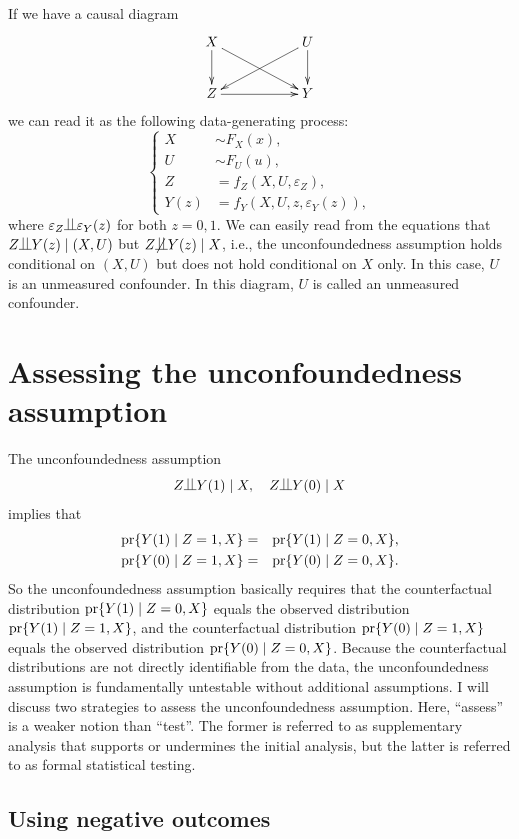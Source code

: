If we have a causal diagram 
$$
\xymatrix{
 X \ar[d]\ar[rrd] & & U\ar[d]\ar[lld] \\
Z\ar[rr] &&Y 
}
$$
we can read it as  the following data-generating process: 
$$
\left\{ 
\begin{aligned}
       X & \sim F_X(x), \\
       U& \sim F_U(u), \\ 
      Z  &=   f_Z(X, U,  \varepsilon_Z) , \\
      Y(z) &=  f_Y(X, U, z, \varepsilon_Y(z)) ,
\end{aligned}
\right. 
$$
where $\varepsilon_Z \ind \varepsilon_Y(z)$ for both $z=0,1$. We can easily read from the equations that $Z\ind Y(z) \mid (X,U)$ but $Z\nind Y(z) \mid X$, i.e., the unconfoundedness assumption holds conditional on $(X,U)$ but does not hold conditional on $X$ only. In this case, $U$ is an unmeasured confounder. In this diagram, $U$ is called an unmeasured confounder. 






\section{Assessing the unconfoundedness assumption}


The unconfoundedness assumption 
$$
Z\ind Y(1) \mid X, \quad 
Z\ind Y(0) \mid X
$$
implies that 
\begin{eqnarray*}
\textup{pr}\{ Y(1)\mid  Z=1, X \}  &=& \textup{pr}\{ Y(1)\mid  Z=0, X \} , \\
\textup{pr}\{ Y(0)\mid  Z=1, X \} &=& \textup{pr}\{ Y(0)\mid  Z=0, X \} . 
\end{eqnarray*}
So the unconfoundedness assumption basically requires that the counterfactual distribution $\textup{pr}\{ Y(1)\mid  Z=0, X \}$ equals the observed distribution 
$\textup{pr}\{ Y(1)\mid  Z=1, X \}$, and the counterfactual distribution $\textup{pr}\{ Y(0)\mid  Z=1, X \} $ equals the observed distribution $\textup{pr}\{ Y(0)\mid  Z=0, X \}$. Because the counterfactual distributions are not directly identifiable from the data, the unconfoundedness assumption is fundamentally untestable without additional assumptions. I will discuss two strategies to assess the unconfoundedness assumption. Here, ``assess'' is a weaker notion than ``test''. The former is referred to as supplementary analysis that supports or undermines the initial analysis, but the latter is referred to as formal statistical testing. 



\subsection{Using negative outcomes}


